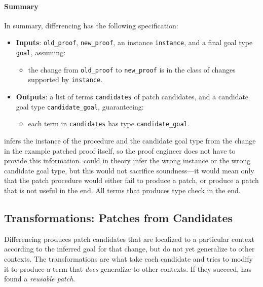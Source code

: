 \paragraph{Summary}
In summary, differencing has the following specification:

\begin{itemize}
\item \textbf{Inputs}: \lstinline{old_proof}, \lstinline{new_proof}, an instance \lstinline{instance}, and a final goal type \lstinline{goal}, assuming:
\begin{itemize}
\item the change from \lstinline{old_proof} to \lstinline{new_proof} is in the class of changes supported by \lstinline{instance}.
\end{itemize}
\item \textbf{Outputs}: a list of terms \lstinline{candidates} of patch candidates, and a candidate goal type \lstinline{candidate_goal}, guaranteeing:
\begin{itemize}
\item each term in \lstinline{candidates} has type \lstinline{candidate_goal}.
\end{itemize}
\end{itemize}
\sysname infers the instance of the procedure and the candidate goal type from the change in the example patched proof itself, so the proof engineer does not have to provide this information.
\sysname could in theory infer the wrong instance or the wrong candidate goal type, but this would not sacrifice soundness---it would mean only that
the patch procedure would either fail to produce a patch, or produce a patch that is not useful in the end.
All terms that \sysname produces type check in the end. %

\subsection{Transformations: Patches from Candidates}
\label{sec:pumpkin-spec-trans}

Differencing produces patch candidates that are localized to a particular context according to the inferred goal for that change,
but do not yet generalize to other contexts.
The transformations are what take each candidate and tries to modify it to produce a term that \textit{does} generalize to other contexts.
If they succeed, \sysname has found a \textit{reusable patch}.

